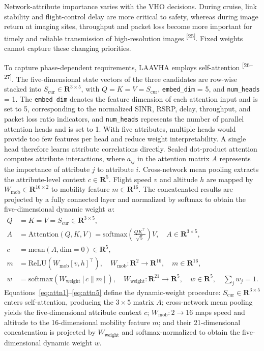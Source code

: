 \documentclass[10pt,a4paper]{article}
\newcommand{\upcite}[1]{\textsuperscript{[#1]}}
\begin{document}
Network-attribute importance varies with the VHO decisions. During cruise, link stability and flight-control delay are more critical to safety, whereas during image return at imaging sites, throughput and packet loss become more important for timely and reliable transmission of high-resolution images \upcite{25}. Fixed weights cannot capture these changing priorities.

To capture phase-dependent requirements, LAAVHA employs self-attention \upcite{26--27}. The five-dimensional state vectors of the three candidates are row-wise stacked into $S_{\mathrm{cur}}\in\mathbf{R}^{3\times5}$, with $Q=K=V=S_{\mathrm{cur}}$, \texttt{embed\_dim} = 5, and \texttt{num\_heads} = 1. The \texttt{embed\_dim} denotes the feature dimension of each attention input and is set to 5, corresponding to the normalized SINR, RSRP, delay, throughput, and packet loss ratio indicators, and \texttt{num\_heads} represents the number of parallel attention heads and is set to 1. With five attributes, multiple heads would provide too few features per head and reduce weight interpretability. A single head therefore learns attribute correlations directly. Scaled dot-product attention computes attribute interactions, where $a_{ij}$ in the attention matrix $A$ represents the importance of attribute $j$ to attribute $i$. Cross-network mean pooling extracts the attribute-level context $c\in\mathbf{R}^5$. Flight speed $v$ and altitude $h$ are mapped by $W_{\mathrm{mob}}\in\mathbf{R}^{16\times2}$ to mobility feature $m\in\mathbf{R}^{16}$. The concatenated results are projected by a fully connected layer and normalized by softmax to obtain the five-dimensional dynamic weight $w$:
\begin{align}
Q &= K = V = S_{\mathrm{cur}}\in\mathbf{R}^{3\times5}, \label{eq:attn1}\\
A &= \mathrm{Attention}(Q,K,V)=\mathrm{softmax}\!\left(\frac{QK^\top}{\sqrt{5}}\right)V,\quad A\in\mathbf{R}^{3\times5}, \label{eq:attn2}\\
c &= \mathrm{mean}(A,\mathrm{dim}=0)\in\mathbf{R}^5, \label{eq:attn3}\\
m &= \mathrm{ReLU}\!\left(W_{\mathrm{mob}}[v,h]^\top\right),\quad W_{\mathrm{mob}}:\mathbf{R}^{2}\rightarrow\mathbf{R}^{16},\quad m\in\mathbf{R}^{16}, \label{eq:attn4}\\
w &= \mathrm{softmax}\!\left(W_{\mathrm{weight}}[c\parallel m]\right),\quad W_{\mathrm{weight}}:\mathbf{R}^{21}\rightarrow\mathbf{R}^{5},\quad w\in\mathbf{R}^{5},\quad \sum_j w_j=1. \label{eq:attn5}
\end{align}
Equations~\eqref{eq:attn1}--\eqref{eq:attn5} define the dynamic-weight procedure: $S_{\mathrm{cur}}\in\mathbf{R}^{3\times5}$ enters self-attention, producing the $3\times5$ matrix $A$; cross-network mean pooling yields the five-dimensional attribute context $c$; $W_{\mathrm{mob}}:2\rightarrow16$ maps speed and altitude to the 16-dimensional mobility feature $m$; and their 21-dimensional concatenation is projected by $W_{\mathrm{weight}}$ and softmax-normalized to obtain the five-dimensional dynamic weight $w$.
\end{document}
